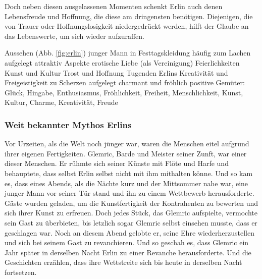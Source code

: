 Doch neben diesen ausgelassenen Momenten schenkt Erlin auch denen Lebensfreude und Hoffnung, die diese am dringensten benötigen. 
Diejenigen, die von Trauer oder Hoffnungslosigkeit niedergedrückt werden, hilft der Glaube an das Lebenswerte, um sich wieder aufzuraffen.
\begin{outline}
	\1 Aussehen (Abb. \ref{fig:erlin})
		\2 junger Mann in Festtagskleidung
		\2 häufig zum Lachen aufgelegt
		\2 attraktiv 
	\1 Aspekte
		\2 erotische Liebe (als Vereinigung)
		\2 Feierlichkeiten
		\2 Kunst und Kultur
		\2 Trost und Hoffnung
	\1 Tugenden Erlins
		\2 Kreativität und Freigeistigkeit
		\2 zu Scherzen aufgelegt
		\2 charmant und fröhlich
	\1 positive Gemüter: Glück, Hingabe, Enthusiasmus, Fröhlichkeit, Freiheit, Menschlichkeit, Kunst, Kultur, Charme, Kreativität, Freude
\end{outline}

\subsubsection{Weit bekannter Mythos Erlins}
Vor Urzeiten, als die Welt noch jünger war, waren die Menschen eitel aufgrund ihrer eigenen Fertigkeiten. 
Glemric, Barde und Meister seiner Zunft, war einer dieser Menschen. 
Er rühmte sich seiner Künste mit Flöte und Harfe und behauptete, dass selbst Erlin selbst nicht mit ihm mithalten könne.
Und so kam es, dass eines Abends, als die Nächte kurz und der Mittsommer nahe war, eine junger Mann vor seiner Tür stand und ihn zu einem Wettbewerb herausforderte. 
Gäste wurden geladen, um die Kunstfertigkeit der Kontrahenten zu bewerten und sich ihrer Kunst zu erfreuen. 
Doch jedes Stück, das Glemric aufspielte, vermochte sein Gast zu überbieten, bis letzlich sogar Glemric selbst einsehen musste, dass er geschlagen war. 
Noch an diesem Abend gelobte er, seine Ehre wiederherzustellen und sich bei seinem Gast zu revanchieren. 
Und so geschah es, dass Glemric ein Jahr später in derselben Nacht Erlin zu einer Revanche herausforderte. 
Und die Geschichten erzählen, dass ihre Wettstreite sich bis heute in derselben Nacht fortsetzen.






